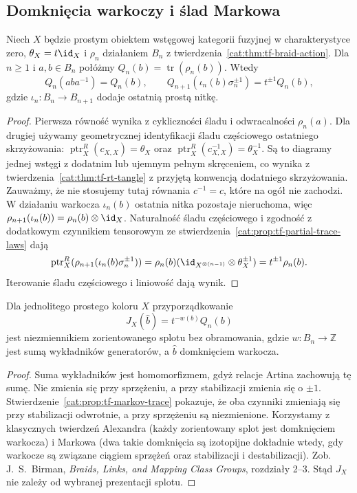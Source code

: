 \subsection{Domknięcia warkoczy i ślad Markowa}

\begin{stwierdzenie}\label{cat:prop:tf-markov-trace}
Niech $X$ będzie prostym obiektem wstęgowej kategorii fuzyjnej w charakterystyce zero, $\theta_X=t\id_X$ i $\rho_n$ działaniem $B_n$ z twierdzenia~\ref{cat:thm:tf-braid-action}. Dla $n\geq1$ i $a,b\in B_n$ połóżmy $Q_n(b)=\operatorname{tr}(\rho_n(b))$. Wtedy
\[
 Q_n(aba^{-1})=Q_n(b),\qquad
 Q_{n+1}(\iota_n(b)\sigma_n^{\pm1})=t^{\pm1}Q_n(b),
\]
gdzie $\iota_n:B_n\to B_{n+1}$ dodaje ostatnią prostą nitkę. 
\end{stwierdzenie}
\begin{proof}
Pierwsza równość wynika z cykliczności śladu i odwracalności $\rho_n(a)$. Dla drugiej używamy geometrycznej identyfikacji śladu częściowego ostatniego skrzyżowania: $\operatorname{ptr}^R_X(c_{X,X})=\theta_X$ oraz $\operatorname{ptr}^R_X(c_{X,X}^{-1})=\theta_X^{-1}$. Są to diagramy jednej wstęgi z dodatnim lub ujemnym pełnym skręceniem, co wynika z twierdzenia~\ref{cat:thm:tf-rt-tangle} z przyjętą konwencją dodatniego skrzyżowania. Zauważmy, że nie stosujemy tutaj równania $c^{-1}=c$, które na ogół nie zachodzi. W działaniu warkocza $\iota_n(b)$ ostatnia nitka pozostaje nieruchoma, więc $\rho_{n+1}(\iota_n(b))=\rho_n(b)\otimes\id_X$. Naturalność śladu częściowego i zgodność z dodatkowym czynnikiem tensorowym ze stwierdzenia~\ref{cat:prop:tf-partial-trace-laws} dają
\[
 \operatorname{ptr}^R_X(\rho_{n+1}(\iota_n(b)\sigma_n^{\pm1}))
 =\rho_n(b)(\id_{X^{\otimes(n-1)}}\otimes\theta_X^{\pm1})
 =t^{\pm1}\rho_n(b).
\]
Iterowanie śladu częściowego i liniowość dają wynik.
\end{proof}

\begin{wniosek}\label{cat:cor:tf-markov-normalization}
Dla jednolitego prostego koloru $X$ przyporządkowanie
\[
 J_X(\widehat b)=t^{-w(b)}Q_n(b)
\]
jest niezmiennikiem zorientowanego splotu bez obramowania, gdzie $w:B_n\to\mathbb Z$ jest sumą wykładników generatorów, a $\widehat b$ domknięciem warkocza.
\end{wniosek}
\begin{proof}
Suma wykładników jest homomorfizmem, gdyż relacje Artina zachowują tę sumę. Nie zmienia się przy sprzężeniu, a przy stabilizacji zmienia się o $\pm1$. Stwierdzenie~\ref{cat:prop:tf-markov-trace} pokazuje, że oba czynniki zmieniają się przy stabilizacji odwrotnie, a przy sprzężeniu są niezmienione. Korzystamy z klasycznych twierdzeń Alexandra (każdy zorientowany splot jest domknięciem warkocza) i Markowa (dwa takie domknięcia są izotopijne dokładnie wtedy, gdy warkocze są związane ciągiem sprzężeń oraz stabilizacji i destabilizacji). Zob. J.~S.~Birman, \emph{Braids, Links, and Mapping Class Groups}, rozdziały 2--3. Stąd $J_X$ nie zależy od wybranej prezentacji splotu.
\end{proof}

